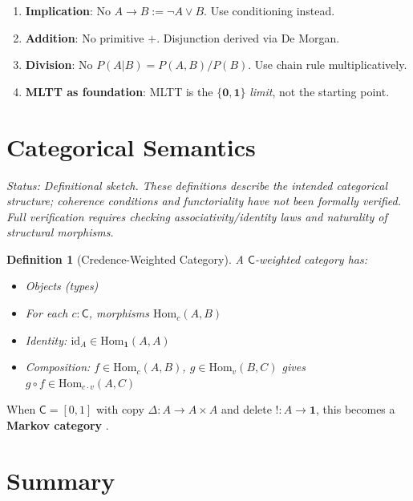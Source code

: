 \documentclass[11pt,a4paper]{article}
\newtheorem{definition}{Definition}[section]
\newcommand{\C}{\mathsf{C}}
\newcommand{\one}{\mathbf{1}}
\newcommand{\zero}{\mathbf{0}}
\newcommand{\negc}{\neg}
\begin{document}
\begin{enumerate}
    \item \textbf{Implication}: No $A \to B := \negc A \lor B$. Use conditioning instead.
    \item \textbf{Addition}: No primitive $+$. Disjunction derived via De Morgan.
    \item \textbf{Division}: No $P(A|B) = P(A,B)/P(B)$. Use chain rule multiplicatively.
    \item \textbf{MLTT as foundation}: MLTT is the $\{\zero,\one\}$ \emph{limit}, not the starting point.
\end{enumerate}

\section{Categorical Semantics}

\emph{Status: Definitional sketch. These definitions describe the intended categorical structure; coherence conditions and functoriality have not been formally verified. Full verification requires checking associativity/identity laws and naturality of structural morphisms.}

\begin{definition}[Credence-Weighted Category]
A \emph{$\C$-weighted category} has:
\begin{itemize}
    \item Objects (types)
    \item For each $c : \C$, morphisms $\mathrm{Hom}_c(A, B)$
    \item Identity: $\mathrm{id}_A \in \mathrm{Hom}_\one(A, A)$
    \item Composition: $f \in \mathrm{Hom}_c(A, B)$, $g \in \mathrm{Hom}_v(B, C)$ gives $g \circ f \in \mathrm{Hom}_{c \cdot v}(A, C)$
\end{itemize}
\end{definition}

When $\C = {[0,1]}$ with copy $\Delta : A \to A \times A$ and delete $! : A \to \mathbf{1}$, this becomes a \textbf{Markov category} \citep{fritz2020synthetic}.

\section{Summary}
\end{document}
